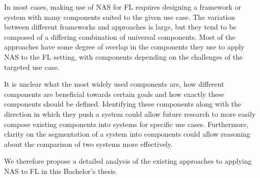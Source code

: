 In most cases, making use of NAS for FL requires designing a framework or system with many components suited to the given use case. The variation between different frameworks and approaches is large, but they tend to be composed of a differing combination of universal components. Most of the approaches have some degree of overlap in the components they use to apply NAS to the FL setting, with components depending on the challenges of the targeted use case. 

It is unclear what the most widely used components are, how different components are beneficial towards certain goals and how exactly these components should be defined. Identifying these components along with the direction in which they push a system could allow future research to more easily compose existing components into systems for specific use cases. Furthermore, clarity on the segmentation of a system into components could allow reasoning about the comparison of two systems more effectively.




We therefore propose a detailed analysis of the existing approaches to applying NAS to FL in this Bachelor's thesis.


